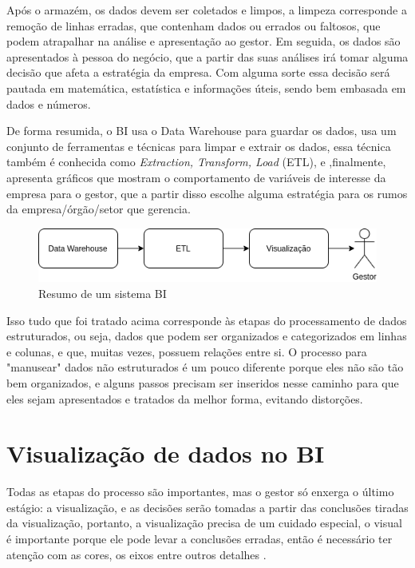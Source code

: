 Após o armazém, os dados devem ser coletados e limpos, a limpeza corresponde a remoção de linhas erradas, que contenham dados ou errados ou faltosos, que podem atrapalhar na análise e apresentação ao gestor. Em seguida, os dados são apresentados à pessoa do negócio, que a partir das suas análises irá tomar alguma decisão que afeta a estratégia da empresa. Com alguma sorte essa decisão será pautada em matemática, estatística e informações úteis, sendo bem embasada em dados e números.

De forma resumida, o BI usa o Data Warehouse para guardar os dados, usa um conjunto de ferramentas e técnicas para limpar e extrair os dados, essa técnica também é conhecida como \textit{Extraction, Transform, Load} (ETL), e ,finalmente, apresenta gráficos que mostram o comportamento de variáveis de interesse da empresa para o gestor, que a partir disso escolhe alguma estratégia para os rumos da empresa/órgão/setor que gerencia.

\begin{figure}[h]
	\centering
	\includegraphics[scale=0.80]{./figures/cap1/resumo_bi.png}
	\caption{Resumo de um sistema BI}
\end{figure}

Isso tudo que foi tratado acima corresponde às etapas do processamento de dados estruturados, ou seja, dados que podem ser organizados e categorizados em linhas e colunas, e que, muitas vezes, possuem relações entre si. O processo para "manusear" dados não estruturados é um pouco diferente porque eles não são tão bem organizados, e alguns passos precisam ser inseridos nesse caminho para que eles sejam apresentados e tratados da melhor forma, evitando distorções.

\section{Visualização de dados no BI}

Todas as etapas do processo são importantes, mas o gestor só enxerga o último estágio: a visualização, e as decisões serão tomadas a partir das conclusões tiradas da visualização, portanto, a visualização precisa de um cuidado especial, o visual é importante porque ele pode levar a conclusões erradas, então é necessário ter atenção com as cores, os eixos entre outros detalhes \cite{claus1}.

